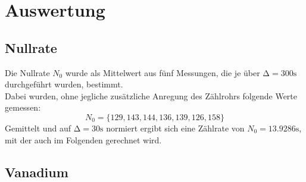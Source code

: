 \newpage
\section{Auswertung}

\subsection{Nullrate}

Die Nullrate $N_0$ wurde als Mittelwert aus fünf Messungen, die je über $\increment=300\si{\second}$ durchgeführt wurden, bestimmt.\\
Dabei wurden, ohne jegliche zusätzliche Anregung des Zählrohrs folgende Werte gemessen:
\begin{equation*}
    N_0 = \{129, 143, 144, 136, 139, 126, 158 \}
\end{equation*}
Gemittelt und auf $\increment=30\si{\second}$ normiert ergibt sich eine Zählrate von $N_0= 13.9286\si{\second}$, mit der auch im Folgenden gerechnet wird.\\


\subsection{Vanadium}

